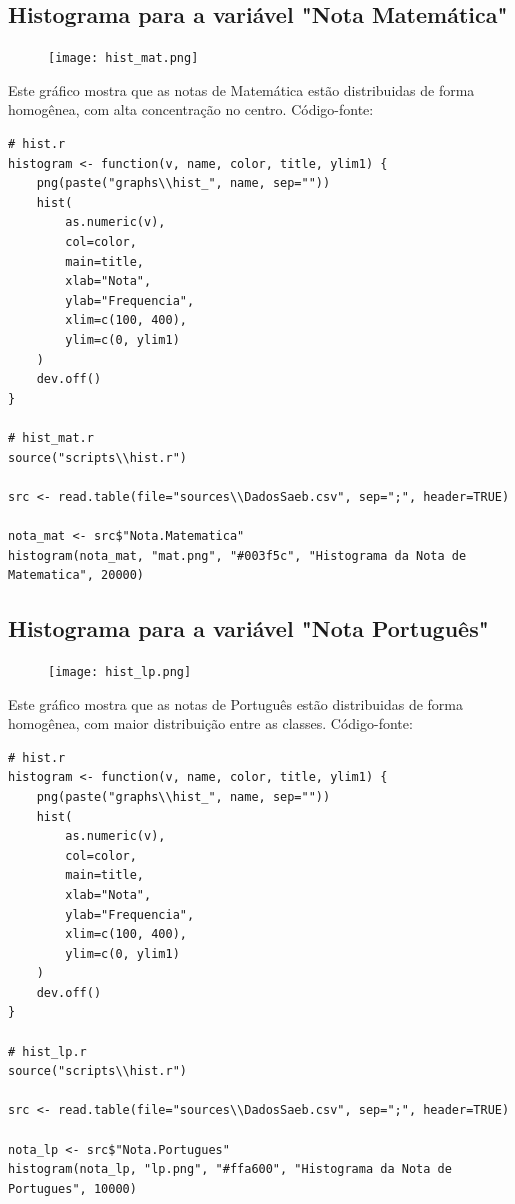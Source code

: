 \documentclass[17pt]{extarticle}
\begin{document}
\subsection{Histograma para a variável "Nota Matemática"}
\begin{figure}[H]
    \texttt{[image: hist\_mat.png]}
    \centering
\end{figure}
Este gráfico mostra que as notas de Matemática estão distribuidas de forma homogênea, com alta concentração no centro. \newline
Código-fonte: \newline
\begin{lstlisting}
# hist.r
histogram <- function(v, name, color, title, ylim1) {
    png(paste("graphs\\hist_", name, sep=""))
    hist(
        as.numeric(v),
        col=color,
        main=title,
        xlab="Nota",
        ylab="Frequencia",
        xlim=c(100, 400),
        ylim=c(0, ylim1)
    )
    dev.off()
}

# hist_mat.r
source("scripts\\hist.r")

src <- read.table(file="sources\\DadosSaeb.csv", sep=";", header=TRUE)

nota_mat <- src$"Nota.Matematica"
histogram(nota_mat, "mat.png", "#003f5c", "Histograma da Nota de Matematica", 20000)
\end{lstlisting}

\subsection{Histograma para a variável "Nota Português"}
\begin{figure}[H]
    \texttt{[image: hist\_lp.png]}
    \centering
\end{figure}
Este gráfico mostra que as notas de Português estão distribuidas de forma homogênea, com maior distribuição entre as classes. \newline
Código-fonte: \newline
\begin{lstlisting}
# hist.r
histogram <- function(v, name, color, title, ylim1) {
    png(paste("graphs\\hist_", name, sep=""))
    hist(
        as.numeric(v),
        col=color,
        main=title,
        xlab="Nota",
        ylab="Frequencia",
        xlim=c(100, 400),
        ylim=c(0, ylim1)
    )
    dev.off()
}

# hist_lp.r
source("scripts\\hist.r")

src <- read.table(file="sources\\DadosSaeb.csv", sep=";", header=TRUE)

nota_lp <- src$"Nota.Portugues"
histogram(nota_lp, "lp.png", "#ffa600", "Histograma da Nota de Portugues", 10000)
\end{lstlisting}
\end{document}
